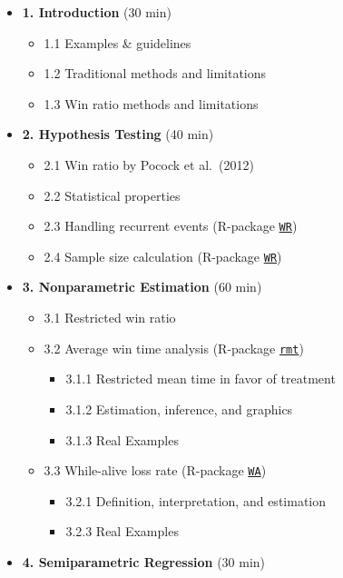 \documentclass[
  letterpaper,
  DIV=11,
  numbers=noendperiod]{scrreprt}
\providecommand{\tightlist}{%
  \setlength{\itemsep}{0pt}\setlength{\parskip}{0pt}}\usepackage{longtable,booktabs,array}
\begin{document}
\begin{itemize}
\tightlist
\item
  \textbf{1. Introduction} (30 min)

  \begin{itemize}
  \tightlist
  \item
    1.1 Examples \& guidelines
  \item
    1.2 Traditional methods and limitations
  \item
    1.3 Win ratio methods and limitations
  \end{itemize}
\item
  \textbf{2. Hypothesis Testing} (40 min)

  \begin{itemize}
  \tightlist
  \item
    2.1 Win ratio by Pocock et al.~(2012)
  \item
    2.2 Statistical properties
  \item
    2.3 Handling recurrent events (R-package
    \href{https://cran.r-project.org/package=WR}{\texttt{WR}})
  \item
    2.4 Sample size calculation (R-package
    \href{https://cran.r-project.org/package=WR}{\texttt{WR}})
  \end{itemize}
\item
  \textbf{3. Nonparametric Estimation} (60 min)

  \begin{itemize}
  \tightlist
  \item
    3.1 Restricted win ratio
  \item
    3.2 Average win time analysis (R-package
    \href{https://cran.r-project.org/package=rmt}{\texttt{rmt}})

    \begin{itemize}
    \tightlist
    \item
      3.1.1 Restricted mean time in favor of treatment
    \item
      3.1.2 Estimation, inference, and graphics
    \item
      3.1.3 Real Examples
    \end{itemize}
  \item
    3.3 While-alive loss rate (R-package
    \href{https://cran.r-project.org/package=WA}{\texttt{WA}})

    \begin{itemize}
    \tightlist
    \item
      3.2.1 Definition, interpretation, and estimation
    \item
      3.2.3 Real Examples
    \end{itemize}
  \end{itemize}
\item
  \textbf{4. Semiparametric Regression} (30 min)


\end{itemize}
\end{document}
